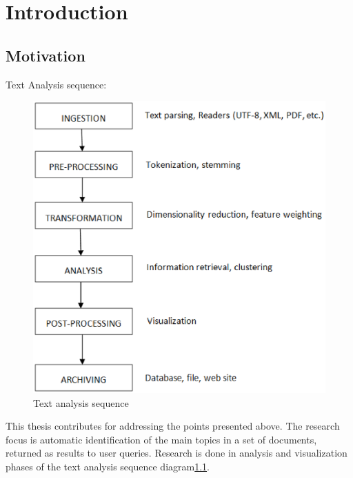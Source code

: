 \chapter{Introduction}
\label{sec:introduction}

\section{Motivation}

Text Analysis sequence:

%
%
\begin{center}
\begin{figure}[htbp]
\label{fig:text_analysis}
	\centering
	\includegraphics[width=\ScaleIfNeeded]{img/text_analysis} 
	\caption[Text analysis sequence]%
           {Text analysis sequence}
\end{figure}

This thesis contributes  for addressing the points presented above. The research focus is automatic identification of the main topics in a set of documents, returned as results to user queries. Research is done in analysis and visualization phases of the text analysis sequence diagram\ref{fig:text_analysis}.




\end{center}

